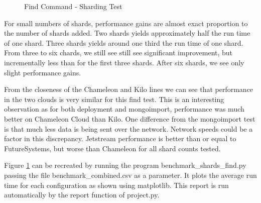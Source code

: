 \documentclass[9pt,twocolumn,twoside]{../../styles/osajnl}
\begin{document}
\begin{figure}[htbp]
\centering
{}
\caption{Find Command - Sharding Test}
\label{fig:shard-find}
\end{figure}


For small numbers of shards, performance gains are almost exact proportion to the number of shards added.  Two shards yields approximately half the run time of one shard.  Three shards yields around one third the run time of one shard.  From three to six chards, we still see still see significant improvement, but incrementally less than for the first three shards.  After six shards, we see only slight performance gains.

From the closeness of the Chameleon and Kilo lines we can see that performance in the two clouds is very similar for this find test.  This is an interesting observation as for both deployment and mongoimport, performance was much better on Chameleon Cloud than Kilo.  One difference from the mongoimport test is that much less data is being sent over the network.  Network speeds could be a factor in this discrepancy.  Jetstream performance is better than or equal to FutureSystems, but worse than Chameleon for all shard counts tested.

Figure \ref{fig:shard-find} can be recreated by running the program benchmark\_shards\_find.py passing the file benchmark\_combined.csv as a parameter.  It plots the average run time for each configuration as shown using matplotlib.  This report is run automatically by the report function of project.py.
\end{document}
